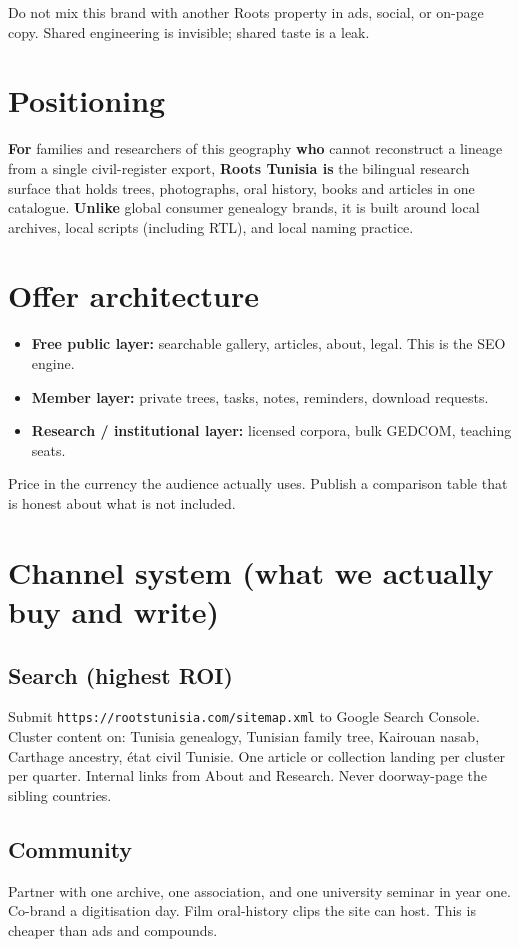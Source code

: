 \documentclass[11pt,a4paper]{article}
\begin{document}
Do not mix this brand with another Roots property in ads, social, or on-page copy. Shared engineering is invisible; shared taste is a leak.

\section{Positioning}
\textbf{For} families and researchers of this geography \textbf{who} cannot reconstruct a lineage from a single civil-register export, \textbf{Roots Tunisia is} the bilingual research surface that holds trees, photographs, oral history, books and articles in one catalogue. \textbf{Unlike} global consumer genealogy brands, it is built around local archives, local scripts (including RTL), and local naming practice.

\section{Offer architecture}
\begin{itemize}
  \item \textbf{Free public layer:} searchable gallery, articles, about, legal. This is the SEO engine.
  \item \textbf{Member layer:} private trees, tasks, notes, reminders, download requests.
  \item \textbf{Research / institutional layer:} licensed corpora, bulk GEDCOM, teaching seats.
\end{itemize}
Price in the currency the audience actually uses. Publish a comparison table that is honest about what is not included.

\section{Channel system (what we actually buy and write)}
\subsection{Search (highest ROI)}
Submit \texttt{https://rootstunisia.com/sitemap.xml} to Google Search Console. Cluster content on: Tunisia genealogy, Tunisian family tree, Kairouan nasab, Carthage ancestry, état civil Tunisie. One article or collection landing per cluster per quarter. Internal links from About and Research. Never doorway-page the sibling countries.

\subsection{Community}
Partner with one archive, one association, and one university seminar in year one. Co-brand a digitisation day. Film oral-history clips the site can host. This is cheaper than ads and compounds.
\end{document}
